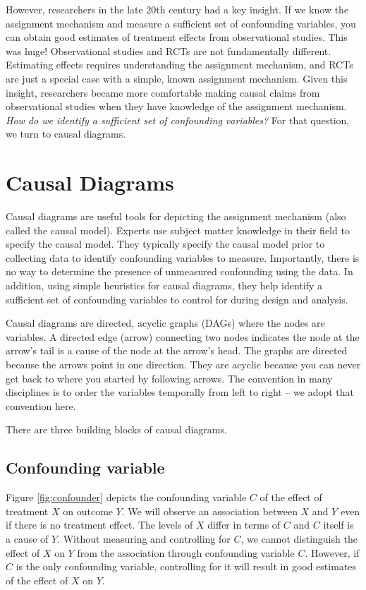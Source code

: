 \documentclass[
]{book}
\begin{document}
However, researchers in the late 20th century had a key insight. If we know the assignment mechanism and measure a sufficient set of confounding variables, you can obtain good estimates of treatment effects from observational studies. This was huge! Observational studies and RCTs are not fundamentally different. Estimating effects requires understanding the assignment mechanism, and RCTs are just a special case with a simple, known assignment mechanism. Given this insight, researchers became more comfortable making causal claims from observational studies when they have knowledge of the assignment mechanism. \emph{How do we identify a sufficient set of confounding variables?} For that question, we turn to causal diagrams.

\hypertarget{causal-diagrams}{%
\section{Causal Diagrams}\label{causal-diagrams}}

Causal diagrams are useful tools for depicting the assignment mechanism (also called the causal model). Experts use subject matter knowledge in their field to specify the causal model. They typically specify the causal model prior to collecting data to identify confounding variables to measure. Importantly, there is no way to determine the presence of unmeasured confounding using the data. In addition, using simple heuristics for causal diagrams, they help identify a sufficient set of confounding variables to control for during design and analysis.

Causal diagrams are directed, acyclic graphs (DAGs) where the nodes are variables. A directed edge (arrow) connecting two nodes indicates the node at the arrow's tail is a cause of the node at the arrow's head. The graphs are directed because the arrows point in one direction. They are acyclic because you can never get back to where you started by following arrows. The convention in many disciplines is to order the variables temporally from left to right -- we adopt that convention here.

There are three building blocks of causal diagrams.

\hypertarget{confounding-variable}{%
\subsection{Confounding variable}\label{confounding-variable}}

Figure \ref{fig:confounder} depicts the confounding variable \(C\) of the effect of treatment \(X\) on outcome \(Y\). We will observe an association between \(X\) and \(Y\) even if there is no treatment effect. The levels of \(X\) differ in terms of \(C\) and \(C\) itself is a cause of \(Y\). Without measuring and controlling for \(C\), we cannot distinguish the effect of \(X\) on \(Y\) from the association through confounding variable \(C\). However, if \(C\) is the only confounding variable, controlling for it will result in good estimates of the effect of \(X\) on \(Y\).
\end{document}
